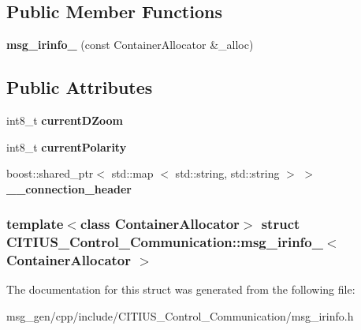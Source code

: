 \subsection*{\-Public \-Member \-Functions}
\begin{DoxyCompactItemize}
\item 
\hypertarget{struct_c_i_t_i_u_s___control___communication_1_1msg__irinfo___afbe83152a93463f97b766c488704cbbf}{{\bfseries msg\-\_\-irinfo\-\_\-} (const \-Container\-Allocator \&\-\_\-alloc)}\label{struct_c_i_t_i_u_s___control___communication_1_1msg__irinfo___afbe83152a93463f97b766c488704cbbf}

\end{DoxyCompactItemize}
\subsection*{\-Public \-Attributes}
\begin{DoxyCompactItemize}
\item 
\hypertarget{struct_c_i_t_i_u_s___control___communication_1_1msg__irinfo___ad4223bcfddfb935cf69ca98c0bfb2add}{int8\-\_\-t {\bfseries current\-D\-Zoom}}\label{struct_c_i_t_i_u_s___control___communication_1_1msg__irinfo___ad4223bcfddfb935cf69ca98c0bfb2add}

\item 
\hypertarget{struct_c_i_t_i_u_s___control___communication_1_1msg__irinfo___a7db673869f2765732c423593a4272345}{int8\-\_\-t {\bfseries current\-Polarity}}\label{struct_c_i_t_i_u_s___control___communication_1_1msg__irinfo___a7db673869f2765732c423593a4272345}

\item 
\hypertarget{struct_c_i_t_i_u_s___control___communication_1_1msg__irinfo___aead2af21061de39aed466bd64b8fc759}{boost\-::shared\-\_\-ptr$<$ std\-::map\*
$<$ std\-::string, std\-::string $>$ $>$ {\bfseries \-\_\-\-\_\-connection\-\_\-header}}\label{struct_c_i_t_i_u_s___control___communication_1_1msg__irinfo___aead2af21061de39aed466bd64b8fc759}

\end{DoxyCompactItemize}
\subsubsection*{template$<$class Container\-Allocator$>$ struct C\-I\-T\-I\-U\-S\-\_\-\-Control\-\_\-\-Communication\-::msg\-\_\-irinfo\-\_\-$<$ Container\-Allocator $>$}



\-The documentation for this struct was generated from the following file\-:\begin{DoxyCompactItemize}
\item 
msg\-\_\-gen/cpp/include/\-C\-I\-T\-I\-U\-S\-\_\-\-Control\-\_\-\-Communication/msg\-\_\-irinfo.\-h\end{DoxyCompactItemize}

